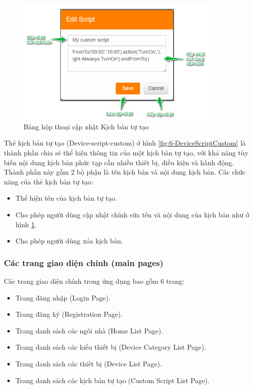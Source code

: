 \documentclass[12pt,a4paper,oneside]{extbook}
\begin{document}
\begin{figure}[h]
  \centering
     \includegraphics[width=10cm]{6-EditCustomScript}
  \caption{Bảng hộp thoại cập nhật Kịch bản tự tạo}\label{fig:6-EditCustomScript}
\end{figure}

Thẻ kịch bản tự tạo (Device-script-custom) ở hình \ref{fig:6-DeviceScriptCustom} là thành phần chia sẻ thể hiện thông tin của một kịch bản tự tạo, với khả năng tùy biến nội dung kịch bản phức tạp cần nhiều thiết bị, điều kiện và hành động. Thành phần này gồm 2 bộ phận là tên kịch bản và nội dung kịch bản. Các chức năng của thẻ kịch bản tự tạo:

\begin{itemize}[topsep=1mm,itemsep=-0.5mm]
\item Thể hiện tên của kịch bản tự tạo.
\item Cho phép người dùng cập nhật chỉnh sửa tên và nội dung của kịch bản như ở hình \ref{fig:6-EditCustomScript}.
\item Cho phép người dùng xóa kịch bản.
\vspace{1mm}
\end{itemize}

\subsubsection{Các trang giao diện chính (main pages)}

Các trang giao diện chính trong ứng dụng bao gồm 6 trang:

\begin{itemize}[topsep=1mm,itemsep=-0.5mm]
\item Trang đăng nhập (Login Page).
\item Trang đăng ký (Registration Page).
\item Trang danh sách các ngôi nhà (Home List Page).
\item Trang danh sách các kiểu thiết bị (Device Category List Page).
\item Trang danh sách các thiết bị (Device List Page).
\item Trang danh sách các kịch bản tự tạo (Custom Script List Page).
\vspace{1mm}
\end{itemize}
\end{document}
